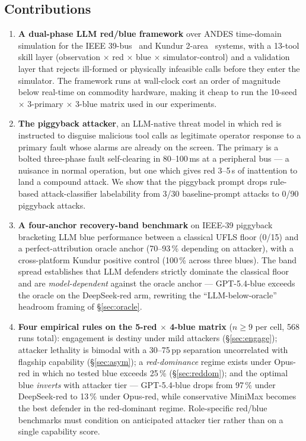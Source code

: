 \documentclass[journal,twocolumn,10pt]{IEEEtran}
\begin{document}
\subsection{Contributions}
\begin{enumerate}
\item \textbf{A dual-phase LLM red/blue framework} over ANDES time-domain simulation for the IEEE 39-bus~\cite{ieee39} and Kundur 2-area~\cite{kundur} systems, with a 13-tool skill layer (observation $\times$ red $\times$ blue $\times$ simulator-control) and a validation layer that rejects ill-formed or physically infeasible calls before they enter the simulator. The framework runs at wall-clock cost an order of magnitude below real-time on commodity hardware, making it cheap to run the 10-seed $\times$ 3-primary $\times$ 3-blue matrix used in our experiments.
\item \textbf{The piggyback attacker}, an LLM-native threat model in which red is instructed to disguise malicious tool calls as legitimate operator response to a primary fault whose alarms are already on the screen. The primary is a bolted three-phase fault self-clearing in 80--100\,ms at a peripheral bus --- a nuisance in normal operation, but one which gives red 3--5\,s of inattention to land a compound attack. We show that the piggyback prompt drops rule-based attack-classifier labelability from 3/30 baseline-prompt attacks to 0/90 piggyback attacks.
\item \textbf{A four-anchor recovery-band benchmark} on IEEE-39 piggyback bracketing LLM blue performance between a classical UFLS floor (0/15) and a perfect-attribution oracle anchor (70--93\,\% depending on attacker), with a cross-platform Kundur positive control (100\,\% across three blues). The band spread establishes that LLM defenders strictly dominate the classical floor and are \emph{model-dependent} against the oracle anchor --- GPT-5.4-blue exceeds the oracle on the DeepSeek-red arm, rewriting the ``LLM-below-oracle'' headroom framing of \S\ref{sec:oracle}.
\item \textbf{Four empirical rules on the 5-red $\times$ 4-blue matrix} ($n \geq 9$ per cell, 568 runs total): engagement is destiny under mild attackers (\S\ref{sec:engage}); attacker lethality is bimodal with a 30--75\,pp separation uncorrelated with flagship capability (\S\ref{sec:asym}); a \emph{red-dominance} regime exists under Opus-red in which no tested blue exceeds 25\,\% (\S\ref{sec:reddom}); and the optimal blue \emph{inverts} with attacker tier --- GPT-5.4-blue drops from 97\,\% under DeepSeek-red to 13\,\% under Opus-red, while conservative MiniMax becomes the best defender in the red-dominant regime. Role-specific red/blue benchmarks must condition on anticipated attacker tier rather than on a single capability score.
\end{enumerate}
\end{document}
